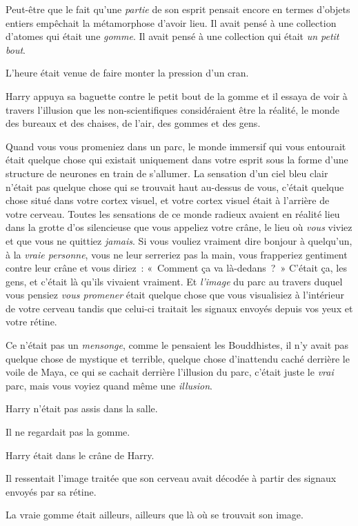 Peut-être que le fait qu'une \emph{partie} de son esprit pensait encore en termes d'objets entiers empêchait la métamorphose d'avoir lieu.
Il avait pensé à une collection d'atomes qui était une \emph{gomme}.
Il avait pensé à une collection qui était \emph{un petit bout}.

L'heure était venue de faire monter la pression d'un cran.

Harry appuya sa baguette contre le petit bout de la gomme et il essaya de voir à travers l'illusion que les non-scientifiques considéraient être la réalité, le monde des bureaux et des chaises, de l'air, des gommes et des gens.

Quand vous vous promeniez dans un parc, le monde immersif qui vous entourait était quelque chose qui existait uniquement dans votre esprit sous la forme d'une structure de neurones en train de s'allumer.
La sensation d'un ciel bleu clair n'était pas quelque chose qui se trouvait haut au-dessus de vous, c'était quelque chose situé dans votre cortex visuel, et votre cortex visuel était à l'arrière de votre cerveau.
Toutes les sensations de ce monde radieux avaient en réalité lieu dans la grotte d'os silencieuse que vous appeliez votre crâne, le lieu où \emph{vous} viviez et que vous ne quittiez \emph{jamais}.
Si vous vouliez vraiment dire bonjour à quelqu'un, à la \emph{vraie personne}, vous ne leur serreriez pas la main, vous frapperiez gentiment contre leur crâne et vous diriez~: «~Comment ça va là-dedans~?~»
 C'était ça, les gens, et c'était là qu'ils vivaient vraiment.
Et \emph{l'image} du parc au travers duquel vous pensiez \emph{vous promener} était quelque chose que vous visualisiez à l'intérieur de votre cerveau tandis que celui-ci traitait les signaux envoyés depuis vos yeux et votre rétine.

Ce n'était pas un \emph{mensonge}, comme le pensaient les Bouddhistes, il n'y avait pas quelque chose de mystique et terrible, quelque chose d'inattendu caché derrière le voile de Maya, ce qui se cachait derrière l'illusion du parc, c'était juste le \emph{vrai} parc, mais vous voyiez quand même une \emph{illusion}.

Harry n'était pas assis dans la salle.

Il ne regardait pas la gomme.

Harry était dans le crâne de Harry.

Il ressentait l'image traitée que son cerveau avait décodée à partir des signaux envoyés par sa rétine.

La vraie gomme était ailleurs, ailleurs que là où se trouvait son image.

